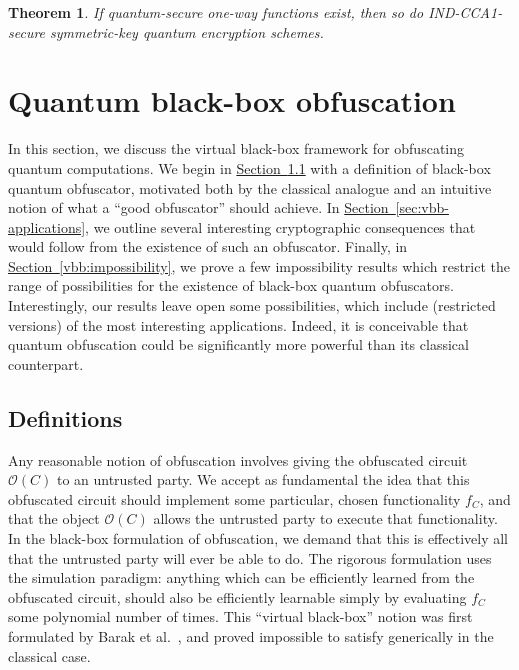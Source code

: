 \documentclass[11pt]{article}
\numberwithin{equation}{section}
\newtheorem{theorem}{Theorem}
\newcommand{\expref}[2]{\texorpdfstring{\hyperref[#2]{#1~\ref{#2}}}{#1~\ref{#2}}}
\newcommand{\algo}{\mathcal}
\begin{document}
\begin{theorem}\label{thm:qOWF-implies-qSKE}
If quantum-secure one-way functions exist, then so do IND-CCA1-secure symmetric-key quantum encryption schemes.
\end{theorem}

\section{Quantum black-box obfuscation}\label{sec:black-box}

In this section, we discuss the virtual black-box framework for obfuscating quantum computations. We begin in \expref{Section}{sec:vbb-definitions} with a definition of black-box quantum obfuscator, motivated both by the classical analogue and an intuitive notion of what a ``good obfuscator'' should achieve. In \expref{Section}{sec:vbb-applications}, we outline several interesting cryptographic consequences that would follow from the existence of such an obfuscator. Finally, in \expref{Section}{vbb:impossibility}, we prove a few impossibility results which restrict the range of possibilities for the existence of black-box quantum obfuscators. Interestingly, our results leave open some possibilities, which include (restricted versions) of the most interesting applications. Indeed, it is conceivable that quantum obfuscation could be significantly more powerful than its classical counterpart.

\subsection{Definitions}\label{sec:vbb-definitions}

Any reasonable notion of obfuscation involves giving the obfuscated circuit $\algo O(C)$ to an untrusted party. We accept as fundamental the idea that this obfuscated circuit should implement some particular, chosen functionality $f_C$, and that the object $\algo O(C)$ allows the untrusted party to execute that functionality. In the black-box formulation of obfuscation, we demand that this is effectively all that the untrusted party will ever be able to do. The rigorous formulation uses the simulation paradigm: anything which can be efficiently learned from the obfuscated circuit, should also be efficiently learnable simply by evaluating $f_C$ some polynomial number of times. This ``virtual black-box'' notion was first formulated by Barak et al.~\cite{BGIRSVY12}, and proved impossible to satisfy generically in the classical case.
\end{document}
